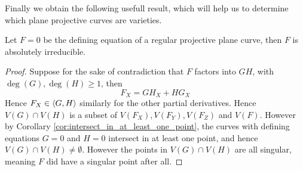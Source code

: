 Finally we obtain the following usefull result, which will help us to determine which plane projective curves are varieties.

\begin{corollary}\label{cor:regular_plane_curves_are_varieties}
  Let $F = 0$ be the defining equation of a regular projective plane curve, then $F$ is absolutely irreducible.
\end{corollary}
\begin{proof}
  Suppose for the sake of contradiction that $F$ factors into $GH$, with $\deg(G), \deg(H) \geq 1$, then
  \begin{equation*}
    F_X = G H_{X} + H G_{X}
  \end{equation*}
  Hence $F_X \in \langle G, H\rangle$ similarly for the other partial derivatives. Hence $V(G) \cap V(H)$ is a subset of $V(F_{X}), V(F_{Y}), V(F_{Z})$ and $V(F)$. However by Corollary \ref{cor:intersect_in_at_least_one_point}, the curves with defining equations $G = 0$ and $H = 0$ intersect in at least one point, and hence $V(G) \cap V(H) \neq \emptyset$. However the points in $V(G) \cap V(H)$ are all singular, meaning $F$ did have a singular point after all.
\end{proof}

